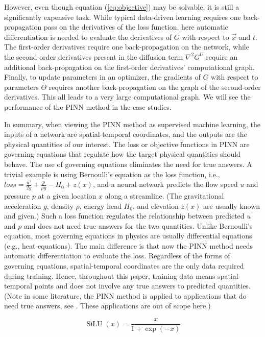 However, even though equation (\ref{eq:objective}) may be solvable, it is still a significantly expensive task.
While typical data-driven learning requires one back-propagation pass on the derivatives of the loss function, here automatic differentiation is needed to evaluate the derivatives of $G$ with respect to $\vec{x}$ and $t$.
The first-order derivatives require one back-propagation on the network, while the second-order derivatives present in the diffusion term $\nabla^2 G^U$ require an additional back-propagation on the first-order derivatives' computational graph. 
Finally, to update parameters in an optimizer, the gradients of $G$ with respect to parameters $\Theta$ requires another back-propagation on the graph of the second-order derivatives.
This all leads to a very large computational graph.
We will see the performance of the PINN method in the case studies.

In summary, when viewing the PINN method as supervised machine learning, the inputs of a network are spatial-temporal coordinates, and the outputs are the physical quantities of our interest.
The loss or objective functions in PINN are governing equations that regulate how the target physical quantities should behave. 
The use of governing equations eliminates the need for true answers.
A trivial example is using Bernoulli's equation as the loss function, i.e., $loss=\frac{u^2}{2g}+\frac{p}{\rho g}-H_0+z(x)$, and a neural network predicts the flow speed $u$ and pressure $p$ at a given location $x$ along a streamline.
(The gravitational acceleration $g$, density $\rho$, energy head $H_0$, and elevation $z(x)$ are usually known and given.)
Such a loss function regulates the relationship between predicted $u$ and $p$ and does not need true answers for the two quantities.
Unlike Bernoulli’s equation, most governing equations in physics are usually differential equations (e.g., heat equations).
The main difference is that now the PINN method needs automatic differentiation to evaluate the loss.
Regardless of the forms of governing equations, spatial-temporal coordinates are the only data required during training.
Hence, throughout this paper, training data means spatial-temporal points and does not involve any true answers to predicted quantities.
(Note in some literature, the PINN method is applied to applications that do need true answers, see \cite{cai_physics-informed_2021}. These applications are out of scope here.)

\begin{equation}\label{eq:silu}
    \operatorname{SiLU}(x)=\frac{x}{1+\exp({-x})}
\end{equation}

